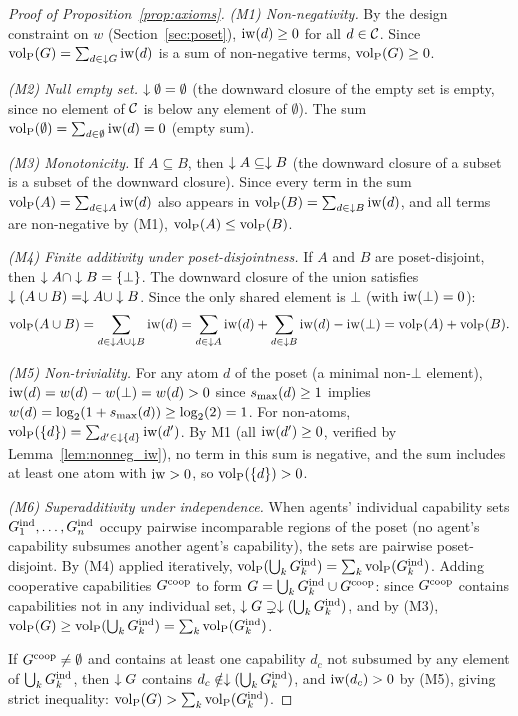 \begin{proof}[Proof of Proposition~\ref{prop:axioms}]
\emph{(M1) Non-negativity.} By the design constraint on $w$
(Section~\ref{sec:poset}), $\operatorname{iw}(d) \geq 0$ for all $d \in \mathcal{C}$. Since
${\operatorname{vol}_{\mathrm{P}}}(G) = \sum_{d \in \downarrow G} \operatorname{iw}(d)$ is a sum of non-negative terms,
${\operatorname{vol}_{\mathrm{P}}}(G) \geq 0$.

\emph{(M2) Null empty set.} $\downarrow \emptyset = \emptyset$ (the downward closure
of the empty set is empty, since no element of $\mathcal{C}$ is below any element of
$\emptyset$). The sum ${\operatorname{vol}_{\mathrm{P}}}(\emptyset) = \sum_{d \in \emptyset} \operatorname{iw}(d) = 0$
(empty sum).

\emph{(M3) Monotonicity.} If $A \subseteq B$, then $\downarrow A \subseteq \downarrow B$
(the downward closure of a subset is a subset of the downward closure). Since
every term in the sum ${\operatorname{vol}_{\mathrm{P}}}(A) = \sum_{d \in \downarrow A} \operatorname{iw}(d)$ also appears in
${\operatorname{vol}_{\mathrm{P}}}(B) = \sum_{d \in \downarrow B} \operatorname{iw}(d)$, and all terms are non-negative by
(M1), ${\operatorname{vol}_{\mathrm{P}}}(A) \leq {\operatorname{vol}_{\mathrm{P}}}(B)$.

\emph{(M4) Finite additivity under poset-disjointness.} If $A$ and $B$ are
poset-disjoint, then $\downarrow A \cap \downarrow B = \{\bot\}$. The downward closure of
the union satisfies $\downarrow(A \cup B) = \downarrow A \cup \downarrow B$. Since the only shared
element is $\bot$ (with $\operatorname{iw}(\bot) = 0$):
\[
{\operatorname{vol}_{\mathrm{P}}}(A \cup B) = \sum_{d \in \downarrow A \cup \downarrow B} \operatorname{iw}(d)
  = \sum_{d \in \downarrow A} \operatorname{iw}(d) + \sum_{d \in \downarrow B} \operatorname{iw}(d)
  - \operatorname{iw}(\bot)
  = {\operatorname{vol}_{\mathrm{P}}}(A) + {\operatorname{vol}_{\mathrm{P}}}(B).
\]

\emph{(M5) Non-triviality.} For any atom $d$ of the poset (a minimal
non-$\bot$ element), $\operatorname{iw}(d) = w(d) - w(\bot) = w(d) > 0$ since $s_{\mathrm{max}}(d)
\geq 1$ implies $w(d) = \log_2(1 + s_{\mathrm{max}}(d)) \geq \log_2(2) = 1$. For
non-atoms, ${\operatorname{vol}_{\mathrm{P}}}(\{d\}) = \sum_{d' \in \downarrow\{d\}} \operatorname{iw}(d')$. By M1
(all $\operatorname{iw}(d') \geq 0$, verified by Lemma~\ref{lem:nonneg_iw}), no term in
this sum is negative, and the sum includes at least one atom with
$\operatorname{iw} > 0$, so ${\operatorname{vol}_{\mathrm{P}}}(\{d\}) > 0$.

\emph{(M6) Superadditivity under independence.} When agents' individual
capability sets $G_{1}^{\mathrm{ind}}, \ldots, G_{n}^{\mathrm{ind}}$ occupy pairwise incomparable
regions of the poset (no agent's capability subsumes another agent's
capability), the sets are pairwise poset-disjoint. By (M4) applied
iteratively, ${\operatorname{vol}_{\mathrm{P}}}(\bigcup_k G_{k}^{\mathrm{ind}}) = \sum_k {\operatorname{vol}_{\mathrm{P}}}(G_{k}^{\mathrm{ind}})$. Adding
cooperative capabilities $G^{\mathrm{coop}}$ to form $G = \bigcup_k G_{k}^{\mathrm{ind}} \cup
G^{\mathrm{coop}}$: since $G^{\mathrm{coop}}$ contains capabilities not in any individual set,
$\downarrow G \supsetneq \downarrow(\bigcup_k G_{k}^{\mathrm{ind}})$, and by (M3),
${\operatorname{vol}_{\mathrm{P}}}(G) \geq {\operatorname{vol}_{\mathrm{P}}}(\bigcup_k G_{k}^{\mathrm{ind}}) = \sum_k {\operatorname{vol}_{\mathrm{P}}}(G_{k}^{\mathrm{ind}})$.

If $G^{\mathrm{coop}} \neq \emptyset$ and contains at least one capability $d_c$ not
subsumed by any element of $\bigcup_k G_{k}^{\mathrm{ind}}$, then $\downarrow G$ contains
$d_c \notin \downarrow(\bigcup_k G_{k}^{\mathrm{ind}})$, and $\operatorname{iw}(d_c) > 0$ by (M5), giving
strict inequality: ${\operatorname{vol}_{\mathrm{P}}}(G) > \sum_k {\operatorname{vol}_{\mathrm{P}}}(G_{k}^{\mathrm{ind}})$.
\end{proof}

